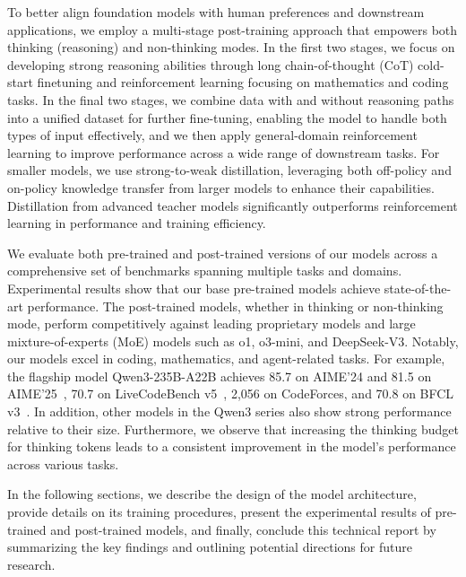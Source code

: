 To better align foundation models with human preferences and downstream applications, we employ a multi-stage post-training approach that empowers both thinking (reasoning) and non-thinking modes. In the first two stages, we focus on developing strong reasoning abilities through long chain-of-thought (CoT) cold-start finetuning and reinforcement learning focusing on mathematics and coding tasks. In the final two stages, we combine data with and without reasoning paths into a unified dataset for further fine-tuning, enabling the model to handle both types of input effectively, and we then apply general-domain reinforcement learning to improve performance across a wide range of downstream tasks. For smaller models, we use strong-to-weak distillation, leveraging both off-policy and on-policy knowledge transfer from larger models to enhance their capabilities.
Distillation from advanced teacher models significantly outperforms reinforcement learning in performance and training efficiency.


We evaluate both pre-trained and post-trained versions of our models across a comprehensive set of benchmarks spanning multiple tasks and domains. Experimental results show that our base pre-trained models achieve state-of-the-art performance. The post-trained models, whether in thinking or non-thinking mode, perform competitively against leading proprietary models and large mixture-of-experts (MoE) models such as o1, o3-mini, and DeepSeek-V3. Notably, our models excel in coding, mathematics, and agent-related tasks. For example, the flagship model Qwen3-235B-A22B achieves 85.7 on AIME'24 and 81.5 on AIME'25~\citep{aime}, 70.7 on LiveCodeBench v5~\citep{livecodebench}, 2,056 on CodeForces, and 70.8 on BFCL v3~\citep{bfcl}. In addition, other models in the Qwen3 series also show strong performance relative to their size. Furthermore, we observe that increasing the thinking budget for thinking tokens leads to a consistent improvement in the model's performance across various tasks.


In the following sections, we describe the design of the model architecture, provide details on its training procedures, present the experimental results of pre-trained and post-trained models, and finally, conclude this technical report by summarizing the key findings and outlining potential directions for future research.